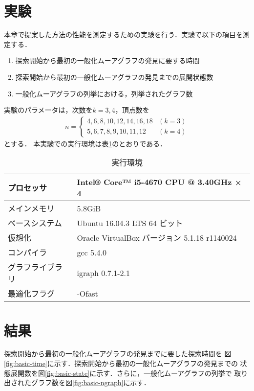 \section{実験}
\label{sect:exp-basic-algorithm}
本章で提案した方法の性能を測定するための実験を行う．実験で以下の項目を測定する．
\begin{enumerate}
\item 探索開始から最初の一般化ムーアグラフの発見に要する時間
\item 探索開始から最初の一般化ムーアグラフの発見までの展開状態数
\item 一般化ムーアグラフの列挙における，列挙されたグラフ数
\end{enumerate}
実験のパラメータは，次数を$k=3,4$，頂点数を
\begin{equation*}
  \begin{aligned}
    n=\begin{cases}
      4,6,8,10,12,14,16,18 & (k=3) \\
      5,6,7,8,9,10,11,12 & (k=4)
    \end{cases}
  \end{aligned}
\end{equation*}
とする．
本実験での実行環境は表\ref{tab:env-lab}のとおりである．
\begin{table}
  \caption{実行環境}
  \label{tab:env-lab}
  \centering
  \begin{tabular}{ll}
    \hline
    プロセッサ & Intel® Core™ i5-4670 CPU @ 3.40GHz × 4 \\ \hline
    メインメモリ & 5.8GiB \\ \hline
    ベースシステム & Ubuntu 16.04.3 LTS 64 ビット \\ \hline
    仮想化 & Oracle VirtualBox バージョン 5.1.18 r1140024 \\ \hline
    コンパイラ & gcc 5.4.0 \\ \hline
    グラフライブラリ & igraph 0.7.1-2.1 \\ \hline
    最適化フラグ & -Ofast \\ \hline
  \end{tabular}
\end{table}

\section{結果}
\label{sect:result-basic-algorithm}
探索開始から最初の一般化ムーアグラフの発見までに要した探索時間を
図\ref{fig:basic-time}に示す．探索開始から最初の一般化ムーアグラフの発見までの
状態展開数を図\ref{fig:basic-state}に示す．さらに，一般化ムーアグラフの列挙で
取り出されたグラフ数を図\ref{fig:basic-ngraph}に示す．

